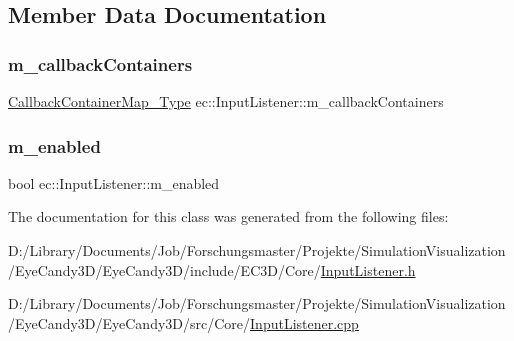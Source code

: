 \subsection{Member Data Documentation}
\mbox{\label{classec_1_1_input_listener_a4553825c97688ab1827d6f4849c92b61}} 
\subsubsection{\texorpdfstring{m\+\_\+callback\+Containers}{m\_callbackContainers}}
{\footnotesize\ttfamily \mbox{\hyperlink{classec_1_1_input_listener_abf0825f1f31a1373c5c03e51da123148}{Callback\+Container\+Map\+\_\+\+Type}} ec\+::\+Input\+Listener\+::m\+\_\+callback\+Containers\hspace{0.3cm}{\ttfamily [protected]}}

\mbox{\label{classec_1_1_input_listener_af36b5fc46ed59886d73b1613aaef5a47}} 
\subsubsection{\texorpdfstring{m\+\_\+enabled}{m\_enabled}}
{\footnotesize\ttfamily bool ec\+::\+Input\+Listener\+::m\+\_\+enabled\hspace{0.3cm}{\ttfamily [protected]}}



The documentation for this class was generated from the following files\+:\begin{DoxyCompactItemize}
\item 
D\+:/\+Library/\+Documents/\+Job/\+Forschungsmaster/\+Projekte/\+Simulation\+Visualization/\+Eye\+Candy3\+D/\+Eye\+Candy3\+D/include/\+E\+C3\+D/\+Core/\mbox{\hyperlink{_input_listener_8h}{Input\+Listener.\+h}}\item 
D\+:/\+Library/\+Documents/\+Job/\+Forschungsmaster/\+Projekte/\+Simulation\+Visualization/\+Eye\+Candy3\+D/\+Eye\+Candy3\+D/src/\+Core/\mbox{\hyperlink{_input_listener_8cpp}{Input\+Listener.\+cpp}}\end{DoxyCompactItemize}
